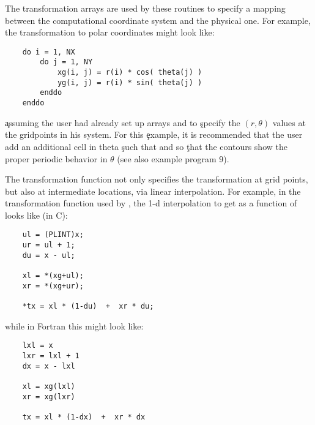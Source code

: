 The transformation arrays are used by these routines to specify a
mapping between the computational coordinate system and the physical
one.  For example, the transformation to polar coordinates might look
like:

\begin{verbatim}
    do i = 1, NX
        do j = 1, NY
            xg(i, j) = r(i) * cos( theta(j) )
            yg(i, j) = r(i) * sin( theta(j) )
        enddo
    enddo
\end{verbatim}

\c assuming the user had already set up arrays  and  to
\c specify the $(r, \theta)$ values at the gridpoints in his system.  For this
\c example, it is recommended that the user add an additional cell in theta
\c such that  and  so
\c that the contours show the proper periodic behavior in $\theta$ (see also
example program 9).

The transformation function not only specifies the transformation at grid
points, but also at intermediate locations, via linear interpolation.  For
example, in the  transformation function used by , 
the 1-d interpolation to get  as a function of  
looks like (in C):

\begin{verbatim}
    ul = (PLINT)x;
    ur = ul + 1;
    du = x - ul;

    xl = *(xg+ul);
    xr = *(xg+ur);

    *tx = xl * (1-du)  +  xr * du;
\end{verbatim}

while in Fortran this might look like:

\begin{verbatim}
    lxl = x
    lxr = lxl + 1
    dx = x - lxl

    xl = xg(lxl)
    xr = xg(lxr)

    tx = xl * (1-dx)  +  xr * dx
\end{verbatim}
